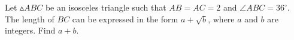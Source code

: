Let $\vartriangle ABC$ be an isosceles triangle such that $AB = AC = 2$ and $\angle ABC = 36^{\circ}$. The length of $BC$ can be expressed in the form $a + \sqrt{b}$, where $a$ and $b$ are integers. Find $a + b$.
